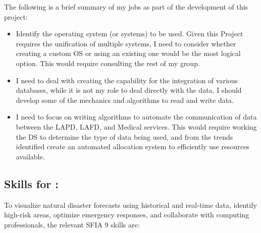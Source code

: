 \documentclass[a4paper, 11pt]{report}
\begin{document}
The following is a brief summary of my jobs as part of the development of this project:
\begin{itemize}
    \item Identify the operating system (or systems) to be used. Given this Project requires the unification of multiple systems, I need to consider whether creating a custom OS or using an existing one would be the most logical option. This would require consulting the rest of my group. 
    \item I need to deal with creating the capability for the integration of various databases, while it is not my role to deal directly with the data, I should develop some of the mechanics and algorithms to read and write data. 
    \item I need to focus on writing algorithms to automate the communication of data between the LAPD, LAFD, and Medical services. This would require working the DS to determine the type of data being used, and from the trends identified create an automated allocation system to efficiently use resources available. 
\end{itemize}


\subsection{Skills for \majB: \studB}

To visualize natural disaster forecasts using historical and real-time data, identify high-risk areas, optimize emergency responses, and collaborate with computing professionals, the relevant SFIA 9 skills are:
\end{document}
